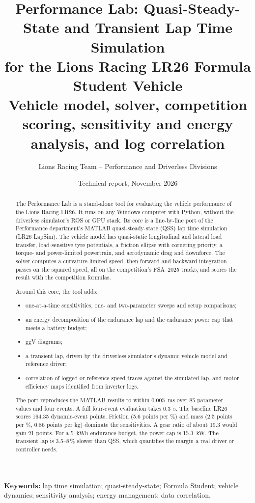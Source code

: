 \documentclass[11pt]{article}
\title{\textbf{Performance Lab: Quasi-Steady-State and Transient Lap Time Simulation\\for the Lions Racing LR26 Formula Student Vehicle}\\[4pt]
\large Vehicle model, solver, competition scoring, sensitivity and energy analysis, and log correlation}
\author{Lions Racing Team -- Performance and Driverless Divisions}
\affil{Formula Student Germany}
\date{Technical report, November 2026}
\begin{document}
\maketitle
\thispagestyle{fancy}

\begin{abstract}
\noindent
The Performance Lab is a stand-alone tool for evaluating the vehicle performance of the Lions Racing LR26. It
runs on any Windows computer with Python, without the driverless simulator's ROS or GPU stack. Its core is a
line-by-line port of the Performance department's MATLAB quasi-steady-state (QSS) lap time simulation (LR26
LapSim). The vehicle model has quasi-static longitudinal and lateral load transfer, load-sensitive tyre
potentials, a friction ellipse with cornering priority, a torque- and power-limited powertrain, and aerodynamic
drag and downforce. The solver computes a curvature-limited speed, then forward and backward integration passes
on the squared speed, all on the competition's FSA~2025 tracks, and scores the result with the competition
formulas.

Around this core, the tool adds:
\begin{itemize}
  \item one-at-a-time sensitivities, one- and two-parameter sweeps and setup comparisons;
  \item an energy decomposition of the endurance lap and the endurance power cap that meets a battery budget;
  \item ggV diagrams;
  \item a transient lap, driven by the driverless simulator's dynamic vehicle model and reference driver;
  \item correlation of logged or reference speed traces against the simulated lap, and motor efficiency maps
        identified from inverter logs.
\end{itemize}
The port reproduces the MATLAB results to within \SI{0.005}{ms} over 85 parameter values and four events. A full
four-event evaluation takes \SI{0.3}{s}. The baseline LR26 scores 164.35 dynamic-event points. Friction (5.6
points per \%) and mass (2.5 points per \%, 0.86 points per kg) dominate the sensitivities. A gear ratio of about
19.3 would gain 21 points. For a \SI{5}{kWh} endurance budget, the power cap is \SI{15.3}{kW}. The transient lap is
3.5--8\,\% slower than QSS, which quantifies the margin a real driver or controller needs.
\end{abstract}

\noindent\textbf{Keywords:} lap time simulation; quasi-steady-state; Formula Student; vehicle dynamics; sensitivity
analysis; energy management; data correlation.
\end{document}
